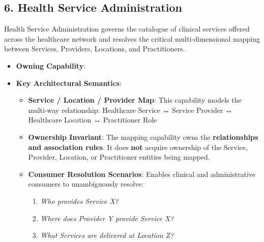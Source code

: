 \par\smallskip
{}\label{rad:em:157}
\subsection*{6. Health Service Administration}
\label{rad:em:159}

Health Service Administration governs the catalogue of clinical services offered across the healthcare network and resolves the critical multi-dimensional mapping between Services, Providers, Locations, and Practitioners.

\label{rad:em:161}

\begin{itemize}

\item
\textbf{Owning Capability}: \texttt{}



\item
\textbf{Key Architectural Semantics}:


\begin{itemize}

\item
\textbf{Service /\allowbreak{} Location /\allowbreak{} Provider Map}: This capability models the multi-way relationship: Healthcare Service ↔ Service Provider ↔ Healthcare Location ↔ Practitioner Role



\item
\textbf{Ownership Invariant}: The mapping capability owns the \textbf{relationships and association rules}. It does \textbf{not} acquire ownership of the Service, Provider, Location, or Practitioner entities being mapped.



\item
\textbf{Consumer Resolution Scenarios}: Enables clinical and administrative consumers to unambiguously resolve:


\begin{enumerate}

\item
\emph{Who provides Service X?}



\item
\emph{Where does Provider Y provide Service X?}



\item
\emph{What Services are delivered at Location Z?}




\end{enumerate}
\end{itemize}
\end{itemize}
